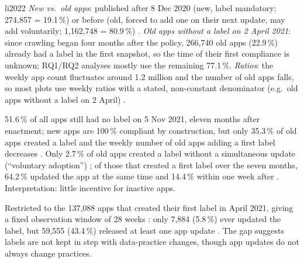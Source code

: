 \begin{papercard}{li2022}
 \emph{New vs.\ old apps}: published after 8 Dec 2020 (new, label mandatory; 274,857 = 19.1\,\%) or before (old, forced to add one on their next update, may add voluntarily; 1,162,748 = 80.9\,\%) . \emph{Old apps without a label on 2 April 2021}: since crawling began four months after the policy, 266,740 old apps (22.9\,\%) already had a label in the first snapshot, so the time of their first compliance is unknown; RQ1/RQ2 analyses mostly use the remaining 77.1\,\%. \emph{Ratios}: the weekly app count fluctuates around 1.2 million and the number of old apps falls, so most plots use weekly ratios with a stated, non-constant denominator (e.g.\ old apps without a label on 2 April) .

 51.6\,\% of all apps still had no label on 5 Nov 2021, eleven months after enactment; new apps are 100\,\% compliant by construction, but only 35.3\,\% of old apps created a label and the weekly number of old apps adding a first label decreases . Only 2.7\,\% of old apps created a label without a simultaneous update (``voluntary adoption'') ; of those that created a first label over the seven months, 64.2\,\% updated the app at the same time and 14.4\,\% within one week after . Interpretation: little incentive for inactive apps.

 Restricted to the 137,088 apps that created their first label in April 2021, giving a fixed observation window of 28 weeks : only 7,884 (5.8\,\%) ever updated the label, but 59,555 (43.4\,\%) released at least one app update . The gap suggests labels are not kept in step with data-practice changes, though app updates do not always change practices.


\end{papercard}
